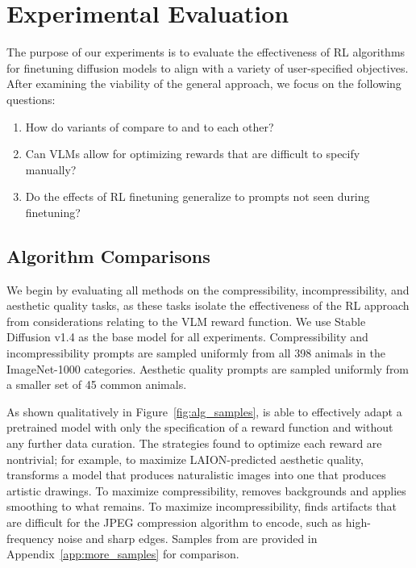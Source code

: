 \vspace{-0.3em}
\section{Experimental Evaluation}
\vspace{-0.4em}


The purpose of our experiments is to evaluate the effectiveness of RL algorithms for finetuning diffusion models to align with a variety of user-specified objectives.
After examining the viability of the general approach, we focus on the following questions:

\vspace{-0.3em}
\begin{enumerate}
    \item How do variants of \methodours{} compare to \methodrwr{} and to each other?
    \item Can VLMs allow for optimizing rewards that are difficult to specify manually?
    \item Do the effects of RL finetuning generalize to prompts not seen during finetuning?
\end{enumerate}

\subsection{Algorithm Comparisons}
\label{sec:alg_comparison}

We begin by evaluating all methods on the compressibility, incompressibility, and aesthetic quality tasks, as these tasks isolate the effectiveness of the RL approach from considerations relating to the VLM reward function.
We use Stable Diffusion v1.4 \citep{rombach2022latent} as the base model for all experiments.
Compressibility and incompressibility prompts are sampled uniformly from all 398 animals in the ImageNet-1000 \citep{deng2009imagenet} categories.
Aesthetic quality prompts are sampled uniformly from a smaller set of 45 common animals.





As shown qualitatively in Figure~\ref{fig:alg_samples}, \methodours{} is able to effectively adapt a pretrained model with only the specification of a reward function and without any further data curation.
The strategies found to optimize each reward are nontrivial; for example, to maximize LAION-predicted aesthetic quality, \methodours{} transforms a model that produces naturalistic images into one that produces artistic drawings.
To maximize compressibility, \methodours{} removes backgrounds and applies smoothing to what remains.
To maximize incompressibility, \methodours{} finds artifacts that are difficult for the JPEG compression algorithm to encode, such as high-frequency noise and sharp edges.
Samples from \methodrwr{} are provided in Appendix~\ref{app:more_samples} for comparison.

